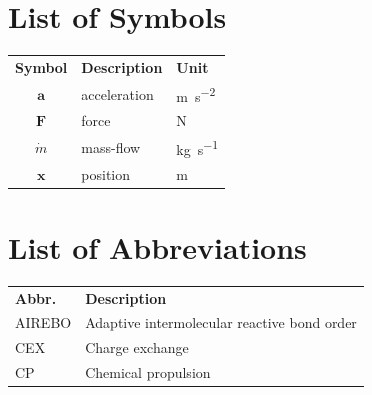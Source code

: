 \documentclass[a4paper,twoside]{ociamthesis}
\newcommand{\vecc}[1]{\mathbf{#1}}
\begin{document}
\dominitoc %

\flushbottom


\tableofcontents

\chapter*{List of Symbols}

\begin{center}
\begin{tabular}{cll}

	\textbf{Symbol} & \textbf{Description} & \textbf{Unit}  \\
	\(\vecc{a}\) & acceleration & \si{\metre\per\second\squared}  \\
	\(\vecc{F}\) & force & \si{\newton}  \\
	\(\dot{m}\) & mass-flow & \si{\kilogram\per\second}  \\
	\(\vecc{x}\) & position & \si{m}  \\

\end{tabular}
\end{center}


\chapter*{List of Abbreviations}

\begin{center}
\begin{tabular}{ll}

	\textbf{Abbr.} & \textbf{Description} \\
	AIREBO & Adaptive intermolecular reactive bond order \\
	CEX    & Charge exchange \\
	CP     & Chemical propulsion \\

\end{tabular}
\end{center}


\listoffigures
\mtcaddchapter
\end{document}
